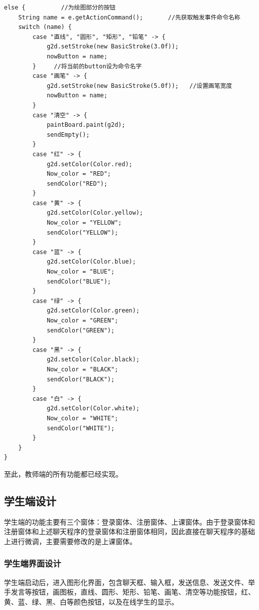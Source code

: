 \documentclass[UTF8,12pt]{article}
\begin{document}
\begin{lstlisting}[title=直线、圆形、矩形、铅笔、画笔、清空等按钮的监听,frame=shadowbox]
    else {          //为绘图部分的按钮
    String name = e.getActionCommand();       //先获取触发事件命令名称
    switch (name) {
        case "直线", "圆形", "矩形", "铅笔" -> {
            g2d.setStroke(new BasicStroke(3.0f));
            nowButton = name;
        }     //将当前的button设为命令名字
        case "画笔" -> {
            g2d.setStroke(new BasicStroke(5.0f));   //设置画笔宽度
            nowButton = name;
        }
        case "清空" -> {
            paintBoard.paint(g2d);
            sendEmpty();
        }
        case "红" -> {
            g2d.setColor(Color.red);
            Now_color = "RED";
            sendColor("RED");
        }
        case "黄" -> {
            g2d.setColor(Color.yellow);
            Now_color = "YELLOW";
            sendColor("YELLOW");
        }
        case "蓝" -> {
            g2d.setColor(Color.blue);
            Now_color = "BLUE";
            sendColor("BLUE");
        }
        case "绿" -> {
            g2d.setColor(Color.green);
            Now_color = "GREEN";
            sendColor("GREEN");
        }
        case "黑" -> {
            g2d.setColor(Color.black);
            Now_color = "BLACK";
            sendColor("BLACK");
        }
        case "白" -> {
            g2d.setColor(Color.white);
            Now_color = "WHITE";
            sendColor("WHITE");
        }
    }
}
\end{lstlisting}

至此，教师端的所有功能都已经实现。

\subsection{学生端设计}
学生端的功能主要有三个窗体：登录窗体、注册窗体、上课窗体。由于登录窗体和注册窗体和上述聊天程序的登录窗体和注册窗体相同，因此直接在聊天程序的基础上进行微调，主要需要修改的是上课窗体。

\subsubsection{学生端界面设计}
学生端启动后，进入图形化界面，包含聊天框、输入框，发送信息、发送文件、举手发言等按钮，画图板，直线、圆形、矩形、铅笔、画笔、清空等功能按钮，红、黄、蓝、绿、黑、白等颜色按钮，以及在线学生的显示。
\end{document}
